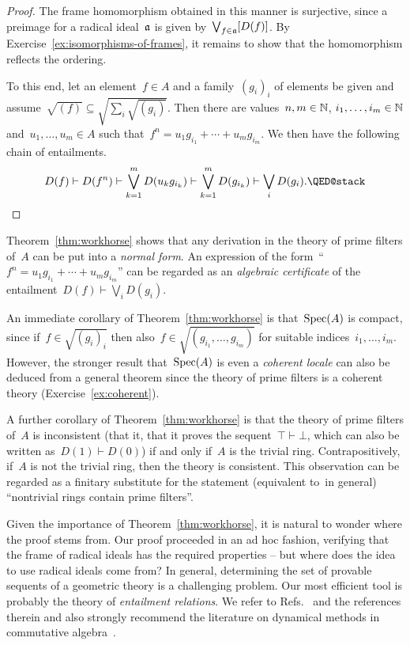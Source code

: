 \documentclass{ws-rv9x6}
\begin{document}
{\begin{proof}
The frame homomorphism obtained in this manner is surjective, since a preimage
for a radical ideal~$\mathfrak{a}$ is given by~$\bigvee_{f \in \mathfrak{a}} [D(f)]$. By
Exercise~\ref{ex:isomorphisms-of-frames}, it
remains to show that the homomorphism reflects the ordering.

To this end, let an element~$f \in A$ and a family~$(g_i)_i$ of elements be
given and assume~$\sqrt{(f)} \subseteq \sqrt{\sum_i \sqrt{(g_i)}}$. Then there
are values~$n,m \in \mathbb{N}$, $i_1,\ldots,i_m \in \mathbb{N}$ and~$u_1,\ldots,u_m \in
A$ such that~$f^n = u_1 g_{i_1} + \cdots + u_m g_{i_m}$. We then have the
following chain of entailments.
\[
  D(f) \vdash
  D(f^n) \vdash
  \bigvee_{k=1}^m D(u_k g_{i_k}) \vdash
  \bigvee_{k=1}^m D(g_{i_k}) \vdash
  \bigvee_i D(g_i). \qedhere
\]
\end{proof}

Theorem~\ref{thm:workhorse} shows that any derivation in the theory of prime
filters of~$A$ can be put into a \emph{normal form}. An expression of the
form~``$f^n = u_1 g_{i_1} + \cdots + u_m g_{i_m}$'' can be regarded as an
\emph{algebraic certificate} of the entailment~$D(f) \vdash \bigvee_i D(g_i)$.

\begin{remark}An immediate corollary of Theorem~\ref{thm:workhorse} is
that~$\mathrm{Spec}(A)$ is compact, since if~$f \in \sqrt{(g_i)_i}$ then also~$f \in
\sqrt{(g_{i_1},\ldots,g_{i_m})}$ for suitable indices~$i_1,\ldots,i_m$.
However, the stronger result that~$\mathrm{Spec}(A)$ is
even a \emph{coherent locale} can also be deduced from a general theorem
since the theory of prime filters is a coherent theory
(Exercise~\ref{ex:coherent}).\end{remark}

\begin{remark}\label{rem:consistency}
A further corollary of Theorem~\ref{thm:workhorse} is that the theory of prime
filters of~$A$ is inconsistent (that it, that it proves the sequent~$\top
\vdash \bot$, which can also be written as~$D(1) \vdash D(0)$) if and only
if~$A$ is the trivial ring. Contrapositively, if~$A$ is not the trivial ring,
then the theory is consistent. This observation can be regarded as a finitary
substitute for the statement (equivalent to~\BPIT in general) ``nontrivial rings contain prime filters''.
\end{remark}

\begin{remark}Given the importance of Theorem~\ref{thm:workhorse}, it is
natural to wonder where the proof stems from. Our proof proceeded in an ad hoc
fashion, verifying that the frame of radical ideals has the required properties
-- but where does the idea to use radical ideals come from? In general, determining the set
of provable sequents of a geometric theory is a challenging problem. Our most
efficient tool is probably the theory of \emph{entailment relations}. We refer
to Refs.~ and
the references therein and also strongly recommend the literature on dynamical
methods in commutative
algebra~.
\end{remark}

}
\end{document}
